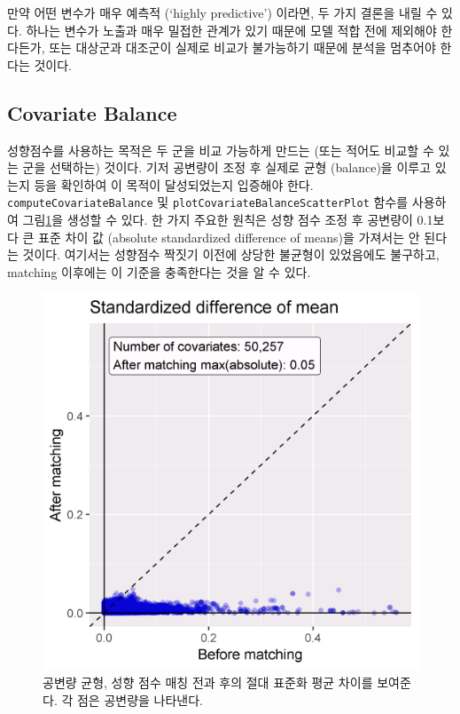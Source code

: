 \documentclass[11pt]{book}
\theoremstyle{definition}
\theoremstyle{definition}
\theoremstyle{definition}
\theoremstyle{remark}
\let\BeginKnitrBlock\begin \let\EndKnitrBlock\end
\begin{document}
\BeginKnitrBlock{rmdimportant}
만약 어떤 변수가 매우 예측적 (`highly predictive') 이라면, 두 가지
결론을 내릴 수 있다. 하나는 변수가 노출과 매우 밀접한 관계가 있기 때문에
모델 적합 전에 제외해야 한다든가, 또는 대상군과 대조군이 실제로 비교가
불가능하기 때문에 분석을 멈추어야 한다는 것이다.
\EndKnitrBlock{rmdimportant}

\subsection{Covariate Balance}\label{covariate-balance}

성향점수를 사용하는 목적은 두 군을 비교 가능하게 만드는 (또는 적어도
비교할 수 있는 군을 선택하는) 것이다. 기저 공변량이 조정 후 실제로 균형
(balance)을 이루고 있는지 등을 확인하여 이 목적이 달성되었는지 입증해야
한다. \texttt{computeCovariateBalance} 및
\texttt{plotCovariateBalanceScatterPlot} 함수를 사용하여
그림\ref{fig:balance}을 생성할 수 있다. 한 가지 주요한 원칙은 성향 점수
조정 후 공변량이 0.1보다 큰 표준 차이 값 (absolute standardized
difference of means)을 가져서는 안 된다는 것이다. 여기서는 성향점수
짝짓기 이전에 상당한 불균형이 있었음에도 불구하고, matching 이후에는 이
기준을 충족한다는 것을 알 수 있다.

\begin{figure}

{\centering \includegraphics[width=0.7\linewidth]{images/PopulationLevelEstimation/balance} 

}

\caption{공변량 균형, 성향 점수 매칭 전과 후의 절대 표준화 평균 차이를 보여준다. 각 점은 공변량을 나타낸다.}\label{fig:balance}
\end{figure}
\end{document}
